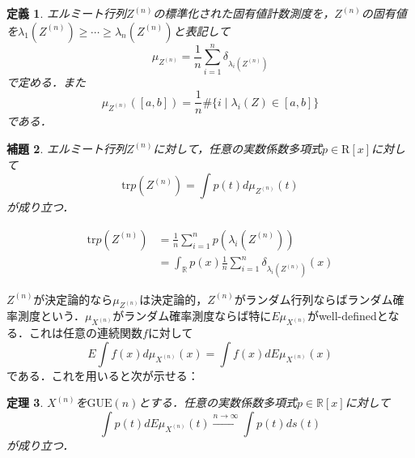 \documentclass{ltjsarticle}
\makeatletter
\theoremstyle{mystyle1}
\newtheorem{dfn}{定義}[section]
\newtheorem{thm}[dfn]{定理}
\newtheorem{lem}[dfn]{補題}
\theoremstyle{mystyle2}
\theoremstyle{mystyle3}
\renewenvironment{proof}[1][\proofname]{\par
  \pushQED{\qed}%
  \normalfont
  \topsep6\p@\@plus6\p@ \trivlist
  \item[\hskip\labelsep{\bfseries\sffamily #1}]\ignorespaces
}{%
  \popQED\endtrivlist\@endpefalse
}
\renewcommand\proofname{証明}
\makeatother
\begin{document}
\begin{dfn}
    エルミート行列$Z^{(n)}$の標準化された固有値計数測度を，$Z^{(n)}$の固有値を$\lambda_1(Z^{(n)})\geq\cdots\geq\lambda_n(Z^{(n)})$と表記して
    \begin{equation}
        \mu_{Z^{(n)}}=\frac{1}{n}\sum_{i=1}^n\delta_{\lambda_i(Z^{(n)})}
    \end{equation}
    で定める．また
    \begin{equation}
        \mu_{Z^{(n)}}([a,b])=\frac{1}{n}\#\{i\mid\lambda_i(Z)\in[a,b]\}
    \end{equation}
    である．
\end{dfn}

\begin{lem}
    エルミート行列$Z^{(n)}$に対して，任意の実数係数多項式$p\in\mathrm{R}[x]$に対して
    \begin{equation}
        \mathrm{tr}p(Z^{(n)})=\int p(t)d\mu_{Z^{(n)}}(t)
    \end{equation}
    が成り立つ．
\end{lem}

\begin{proof}
    \begin{equation}
        \begin{split}
            \mathrm{tr}p(Z^{(n)}) & =\frac{1}{n}\sum_{i=1}^np(\lambda_i(Z^{(n)}))                             \\
            & =\int_\mathbb{R}p(x)\frac{1}{n}\sum_{i=1}^n\delta_{\lambda_i(Z^{(n)})}(x)
        \end{split}
    \end{equation}
\end{proof}

$Z^{(n)}$が決定論的なら$\mu_{Z^{(n)}}$は決定論的，$Z^{(n)}$がランダム行列ならばランダム確率測度という．$\mu_{X^{(n)}}$がランダム確率測度ならば特に$E\mu_{X^{(n)}}$がwell-definedとなる．これは任意の連続関数$f$に対して
\begin{equation}
    E\int f(x)d\mu_{X^{(n)}}(x)=\int f(x)dE\mu_{X^{(n)}}(x)
\end{equation}
である．これを用いると次が示せる：

\begin{thm}\label{thm:1-24}
    $X^{(n)}$を$\mathrm{GUE}(n)$とする．任意の実数係数多項式$p\in\mathbb{R}[x]$に対して
    \begin{equation}
        \int p(t)dE\mu_{X^{(n)}}(t)\overset{n\to\infty}{\longrightarrow}\int p(t)ds(t)
    \end{equation}
    が成り立つ．
\end{thm}
\end{document}
